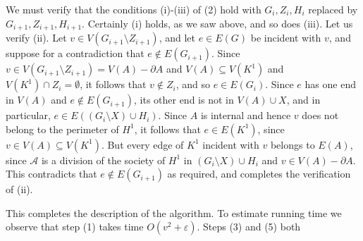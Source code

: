 We must verify that the conditions (i)-(iii) of (2) hold with $G_i, Z_i, H_i$ replaced by $G_{i+1}, Z_{i+1}, H_{i+1}$. Certainly (i) holds, as we saw above, and so does (iii). Let us verify (ii). Let $v \in V(G_{i+1} \setminus Z_{i+1})$, and let $e \in E(G)$ be incident with $v$, and suppose for a contradiction that $e \notin E(G_{i+1})$. Since $v \in V(G_{i+1} \setminus Z_{i+1}) = V(A) - \partial A$ and $V(A) \subseteq V(K^1)$ and $V(K^1) \cap Z_i = \emptyset$, it follows that $v \notin Z_i$, and so $e \in E(G_i)$. Since $e$ has one end in $V(A)$ and $e \notin E(G_{i+1})$, its other end is not in $V(A) \cup X$, and in particular, $e \in E((G_i \setminus X) \cup H_i)$. Since $A$ is internal and hence $v$ does not belong to the perimeter of $H^1$, it follows that $e \in E(K^1)$, since $v \in V(A) \subseteq V(K^1)$. But every edge of $K^1$ incident with $v$ belongs to $E(A)$, since $\mathcal{A}$ is a division of the society of $H^1$ in $(G_i \setminus X) \cup H_i$ and $v \in V(A) - \partial A$. This contradicts that $e \notin E(G_{i+1})$ as required, and completes the verification of (ii).

This completes the description of the algorithm. To estimate running time we observe that step (1) takes time $O(v^2 + \varepsilon)$. Steps (3) and (5) both
